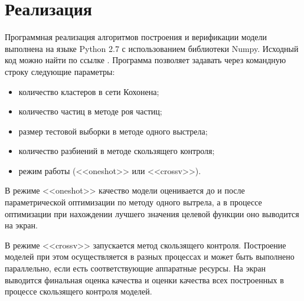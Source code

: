 \section{Реализация}
Программная реализация алгоритмов построения и верификации модели выполнена на языке
Python 2.7 с использованием библиотеки Numpy. Исходный код можно найти по ссылке \cite{sources}.
Программа позволяет задавать через командную строку следующие параметры:
\begin{itemize}
  \item количество кластеров в сети Кохонена;
  \item количество частиц в методе роя частиц;
  \item размер тестовой выборки в методе одного выстрела;
  \item количество разбиений в методе скользящего контроля;
  \item режим работы (<<oneshot>>  или <<crossv>>).
\end{itemize}
\par
В режиме <<oneshot>> качество модели оценивается до и после параметрической
оптимизации по методу одного вытрела, а в процессе оптимизации при нахождении
лучшего значения целевой функции оно выводится на экран.
\par
В режиме <<crossv>> запускается метод скользящего контроля. Построение моделей при
этом осуществляется в разных процессах и может быть выполнено параллельно, если
есть соответствующие аппаратные ресурсы. На экран выводится финальная оценка качества и
оценки качества всех построенных в процессе скользящего контроля моделей.

